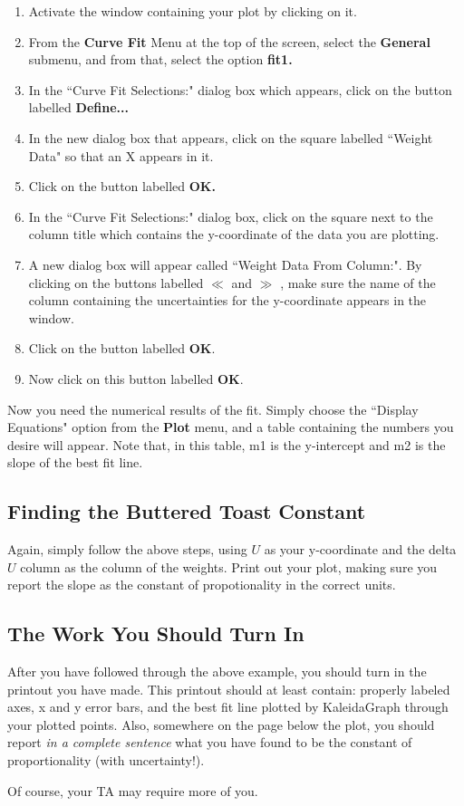 \documentclass[12pt]{article}
\begin{document}
\noindent
\begin{enumerate}
\item Activate the window containing your plot by clicking on it.
\item From the {\bf Curve Fit} Menu at the top of the screen, select the {\bf General}
submenu, and from that, select the option {\bf fit1.}
\item In the ``Curve Fit Selections:" dialog box which appears, click on the button
labelled {\bf Define...}
\item In the new dialog box that appears, click on the square labelled ``Weight Data"
so that an X appears in it.
\item Click on the button labelled {\bf OK.}
\item In the ``Curve Fit Selections:" dialog box, click on the square next to the
column title which contains the y-coordinate of the data you are plotting.
\item A new dialog box will appear called ``Weight Data From Column:". By clicking on
the buttons labelled $\ll$ and $\gg$ , make sure the name of the column containing the
uncertainties for the y-coordinate appears in the window.
\item Click on the button labelled {\bf OK}.
\item Now click on this button labelled {\bf OK}.
\end{enumerate}
\indent

Now you need the numerical results of the fit. Simply choose the ``Display Equations"
option from the {\bf Plot} menu, and a table containing the numbers you desire will
appear. Note that, in this table, m1 is the y-intercept and m2 is the slope of the
best fit line.

\subsection{Finding the Buttered Toast Constant}

Again, simply follow the above steps, using $U$ as your y-coordinate and the delta$U$ 
column as the column of the weights. Print out your plot, making sure you report the
slope as the constant of propotionality in the correct units.
  
\subsection{The Work You Should Turn In}

After you have followed through the above example, you should turn in the printout you have made. This printout should at least contain: properly labeled axes, x and y error bars, and the best fit line plotted by KaleidaGraph through your plotted points. Also, somewhere on the page below the plot, you should report {\it in a complete sentence} what you have found to be the constant of proportionality (with uncertainty!).

Of course, your TA may require more of you.
\end{document}

